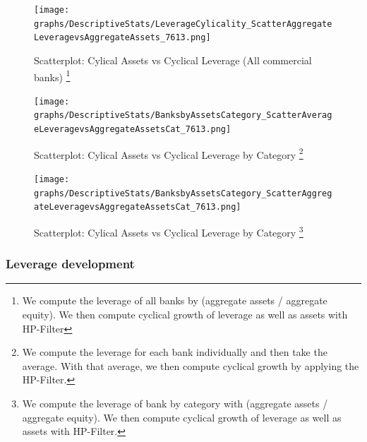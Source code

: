 \documentclass[12pt, a4paper]{article} %
\begin{document}
\begin{figure}[H]
\begin{minipage}{\textwidth}
\centering
\caption[1]{Scatterplot: Cylical Assets vs Cyclical Leverage (All commercial banks) \footnote{We compute the leverage of all banks by (aggregate assets / aggregate equity). We then compute cyclical growth of leverage as well as assets with HP-Filter}}
\texttt{[image: graphs/DescriptiveStats/LeverageCylicality\_ScatterAggregateLeveragevsAggregateAssets\_7613.png]}
\label{fig:ScatterCyclicalAggregateLeverageAssets}
\end{minipage}
\end{figure}


\begin{figure}[H]
\begin{minipage}{\textwidth}
\centering
\caption[1]{Scatterplot: Cylical Assets vs Cyclical Leverage by Category \footnote{We compute the leverage for each bank individually and then take the average. With that average, we then compute cyclical growth by applying the HP-Filter.}}
\texttt{[image: graphs/DescriptiveStats/BanksbyAssetsCategory\_ScatterAverageLeveragevsAggregateAssetsCat\_7613.png]}
\label{fig:ScatterAverageCyclicalLeverageAssetsbyCat}
\end{minipage}
\end{figure}

\begin{figure}[H]
\begin{minipage}{\textwidth}
\centering
\caption[1]{Scatterplot: Cylical Assets vs Cyclical Leverage by Category \footnote{We compute the leverage of bank by category with (aggregate assets / aggregate equity). We then compute cyclical growth of leverage as well as assets with HP-Filter.}}
\texttt{[image: graphs/DescriptiveStats/BanksbyAssetsCategory\_ScatterAggregateLeveragevsAggregateAssetsCat\_7613.png]}
\label{fig:ScatterAggregateCyclicalLeverageAssetsbyCat}
\end{minipage}
\end{figure}

\subsubsection{Leverage development}
\label{sec:LeverageDevelopment}
\end{document}
